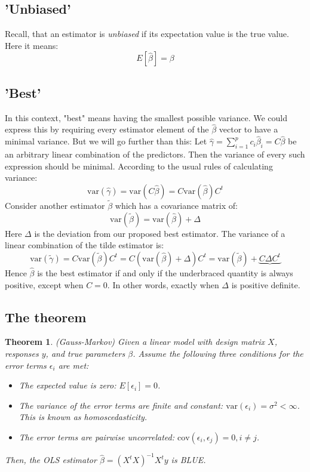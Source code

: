 \documentclass[12pt, a4paper]{article}
\newtheorem{theorem}{Theorem}
\begin{document}
\subsection{'Unbiased'}
Recall, that an estimator is \textit{unbiased} if its expectation value is the true value. Here it means:
\begin{equation}
E[\hat{\beta}]=\beta
\end{equation}

\subsection{'Best'}
In this context, "best" means having the smallest possible variance. We could express this by requiring every estimator element of the $\hat{\beta}$ vector to have a minimal variance. But we will go further than this: Let $\hat{\gamma}=\sum_{i=1}^p c_i\hat{\beta}_i=C\hat{\beta}$ be an arbitrary linear combination of the predictors. Then the variance of every such expression should be minimal. According to the usual rules of calculating variance:
\begin{equation}
\textrm{var}(\hat{\gamma})=\textrm{var}(C\hat{\beta})=C\textrm{var}(\hat{\beta})C^t
\end{equation}
Consider another estimator $\tilde{\beta}$ which has a covariance matrix of:
\begin{equation}
\textrm{var}(\tilde{\beta})=\textrm{var}(\hat{\beta})+\Delta
\end{equation}
Here $\Delta$ is the deviation from our proposed best estimator. The variance of a linear combination of the tilde estimator is:
\begin{equation}
\textrm{var}(\tilde{\gamma})=C\textrm{var}(\tilde{\beta})C^t=C(\textrm{var}(\hat{\beta})+\Delta)C^t=\textrm{var}(\tilde{\beta})+\underbrace{C\Delta C^t}
\end{equation}
Hence $\hat{\beta}$ is the best estimator if and only if the underbraced quantity is always positive, except when $C=0$. In other words, exactly when $\Delta$ is positive definite.

\subsection{The theorem}

\begin{theorem}
(Gauss-Markov) Given a linear model with design matrix $X$, responses $y$, and true parameters $\beta$. Assume the following three conditions for the error terms $\epsilon_i$ are met:
\begin{itemize}
\item The expected value is zero: $E[\epsilon_i]=0$.
\item The variance of the error terms are finite and constant: $\textrm{var}(\epsilon_i)=\sigma^2<\infty$. This is known as homoscedasticity.
\item The error terms are pairwise uncorrelated: $\textrm{cov}(\epsilon_i,\epsilon_j)=0, i\neq j$.
\end{itemize}
Then, the OLS estimator $\hat{\beta}=(X^t X)^{-1}X^t y$ is BLUE.
\end{theorem}
\end{document}
